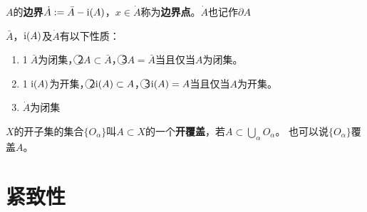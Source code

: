 \begin{definition}
$A$的\textbf{边界}$\dot{A} := \bar{A} - \operatorname{i}(A)$，$x \in \dot{A}$称为\textbf{边界点}。$\dot{A}$也记作$\partial A$
\end{definition}

\begin{theorem}
$\bar{A}$，$\operatorname{i}(A)$及$\dot{A}$有以下性质：
\begin{enumerate}[（a）]
\item \textcircled{1}$\bar{A}$为闭集，\textcircled{2}$A \subset \bar{A}$，\textcircled{3}$A = \bar{A}$当且仅当$A$为闭集。
\item \textcircled{1}$\operatorname{i}(A)$为开集，\textcircled{2}$\operatorname{i}(A) \subset A$，\textcircled{3}$\operatorname{i}(A) = A$当且仅当$A$为开集。
\item $\dot{A}$为闭集
\end{enumerate}
\end{theorem}

\begin{definition}
$X$的开子集的集合$\{O_\alpha\}$叫$A \subset X$的一个\textbf{开覆盖}，若$A \subset \bigcup\limits_\alpha O_\alpha$。
也可以说$\{O_\alpha\}$覆盖$A$。
\end{definition}

\section{紧致性}
